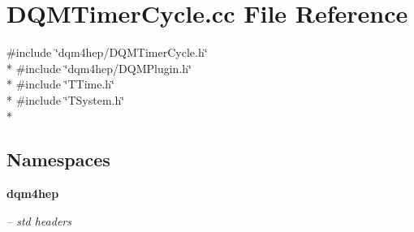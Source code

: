\section{D\+Q\+M\+Timer\+Cycle.\+cc File Reference}
\label{DQMTimerCycle_8cc}
{\ttfamily \#include \char`\"{}dqm4hep/\+D\+Q\+M\+Timer\+Cycle.\+h\char`\"{}}\\*
{\ttfamily \#include \char`\"{}dqm4hep/\+D\+Q\+M\+Plugin.\+h\char`\"{}}\\*
{\ttfamily \#include \char`\"{}T\+Time.\+h\char`\"{}}\\*
{\ttfamily \#include \char`\"{}T\+System.\+h\char`\"{}}\\*
\subsection*{Namespaces}
\begin{DoxyCompactItemize}
\item 
 {\bf dqm4hep}
\begin{DoxyCompactList}\small\item\em -- std headers \end{DoxyCompactList}\end{DoxyCompactItemize}
